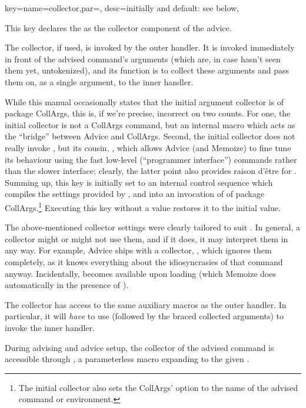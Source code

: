 \documentclass[a4paper,11pt]{article}
\begin{document}
\begin{doc}{
    key={name=collector,par=,
      desc=initially and default: see below},
  }

  This key declares the  as the collector component of
  the advice.
  
  The collector, if used, is invoked by the outer handler.  It is invoked
  immediately in front of the advised command's arguments (which are, in case
   hasn't seen them yet, untokenized), and its function is to
  collect these arguments and pass them on, as a single argument, to the inner
  handler.

  While this manual occasionally states that the initial argument collector is
   of package CollArgs, this is, if we're precise,
  incorrect on two counts.  For one, the initial collector is not a CollArgs
  command, but an internal macro which acts as the ``bridge'' between Advice
  and CollArgs. Second, the initial collector does not really invoke
  , but its cousin, ,
  which allows Advice (and Memoize) to fine tune its behaviour
  using the fast low-level (``programmer interface'') commands rather than the
  slower  interface; clearly, the latter point also provides
  raison d'être for .  Summing up, this key
  is initially set to an internal control sequence which compiles the settings
  provided by ,  and
   into an invocation of
   of package CollArgs.\footnote{The initial
    collector also sets the CollArgs' option  to the
    name of the advised command or environment.}  Executing this key without a
  value restores it to the initial value.

  The above-mentioned collector settings were clearly tailored to suit
  .  In general, a collector might or might not use
  them, and if it does, it may interpret them in any way.  For example, Advice
  ships with a  collector, , which
  ignores them completely, as it knows everything about the idiosyncrasies of
  that command anyway.  Incidentally,  becomes
  available upon loading  (which Memoize does
  automatically in the presence of \TikZ).

  The collector has access to the same auxiliary macros as the outer handler.
  In particular, it will \emph{have} to use  (followed
  by the braced collected arguments) to invoke the inner handler.
  
  During advising and advice setup, the collector of the advised command is
  accessible through , a parameterless macro
  expanding to the given .
\end{doc}
\end{document}
